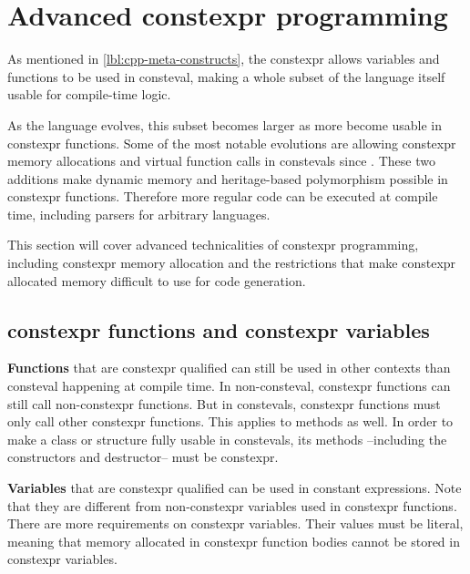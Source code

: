 \documentclass[../main]{subfiles}
\begin{document}
\section{
  Advanced constexpr programming
}
\label{lbl:constexpr-programming}


As mentioned in \ref{lbl:cpp-meta-constructs}, the \gls{constexpr}
allows variables and functions to be used in \gls{consteval},
making a whole subset of the \cpp language itself usable for compile-time logic.

As the language evolves, this subset becomes larger as more \cpp become
usable in \gls{constexpr} functions. Some of the most notable evolutions
are allowing \gls{constexpr} memory allocations and virtual function calls
in \glspl{consteval} since .
These two additions make dynamic memory and heritage-based polymorphism
possible in \gls{constexpr} functions. Therefore more regular \cpp code can be
executed at compile time, including parsers for arbitrary languages.

This section will cover advanced technicalities of \gls{constexpr} programming,
including \gls{constexpr} memory allocation and the restrictions that make
\gls{constexpr} allocated memory difficult to use for \cpp code generation.

\clearpage%

\subsection{
  \gls{constexpr} functions and \gls{constexpr} variables
}

\textbf{Functions} that are \gls{constexpr} qualified can still be used
in other contexts than \gls{consteval} happening at compile time.
In non-\gls{consteval}, \gls{constexpr} functions can still call
non-\gls{constexpr} functions. But in \glspl{consteval}, \gls{constexpr}
functions must only call other \gls{constexpr} functions.
This applies to methods as well. In order to make a \cpp class or structure
fully usable in \glspl{consteval}, its methods --including the constructors
and destructor-- must be \gls{constexpr}.

\textbf{Variables} that are \gls{constexpr} qualified can be
used in constant expressions. Note that they are different from
non-\gls{constexpr} variables used in \gls{constexpr} functions.
There are more requirements on \gls{constexpr} variables.
Their values must be literal, meaning that memory allocated in \gls{constexpr}
function bodies cannot be stored in \gls{constexpr} variables.
\end{document}

